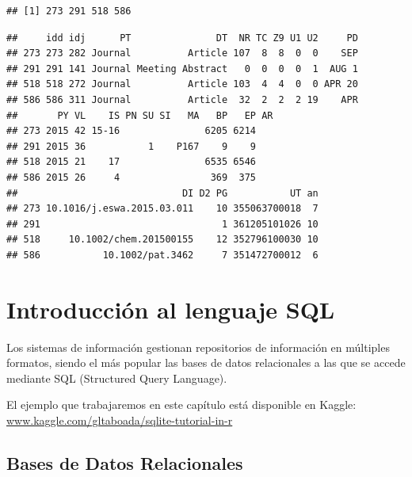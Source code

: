 \documentclass[
]{book}
\newenvironment{Shaded}{\begin{snugshade}}{\end{snugshade}}
\newcommand{\CommentTok}[1]{\textcolor[rgb]{0.56,0.35,0.01}{\textit{#1}}}
\newcommand{\DecValTok}[1]{\textcolor[rgb]{0.00,0.00,0.81}{#1}}
\newcommand{\FunctionTok}[1]{\textcolor[rgb]{0.13,0.29,0.53}{\textbf{#1}}}
\newcommand{\NormalTok}[1]{#1}
\newcommand{\SpecialCharTok}[1]{\textcolor[rgb]{0.81,0.36,0.00}{\textbf{#1}}}
\begin{document}
\begin{verbatim}
## [1] 273 291 518 586
\end{verbatim}

\begin{Shaded}
\end{Shaded}

\begin{verbatim}
##     idd idj      PT               DT  NR TC Z9 U1 U2     PD
## 273 273 282 Journal          Article 107  8  8  0  0    SEP
## 291 291 141 Journal Meeting Abstract   0  0  0  0  1  AUG 1
## 518 518 272 Journal          Article 103  4  4  0  0 APR 20
## 586 586 311 Journal          Article  32  2  2  2 19    APR
##       PY VL    IS PN SU SI   MA   BP   EP AR
## 273 2015 42 15-16               6205 6214   
## 291 2015 36           1    P167    9    9   
## 518 2015 21    17               6535 6546   
## 586 2015 26     4                369  375   
##                             DI D2 PG           UT an
## 273 10.1016/j.eswa.2015.03.011    10 355063700018  7
## 291                                1 361205101026 10
## 518     10.1002/chem.201500155    12 352796100030 10
## 586           10.1002/pat.3462     7 351472700012  6
\end{verbatim}

\hypertarget{introducciuxf3n-al-lenguaje-sql}{%
\chapter{Introducción al lenguaje SQL}\label{introducciuxf3n-al-lenguaje-sql}}

Los sistemas de información gestionan repositorios de información en múltiples formatos,
siendo el más popular las bases de datos relacionales a las que se accede mediante SQL (Structured Query Language).

El ejemplo que trabajaremos en este capítulo está disponible en Kaggle: \href{https://www.kaggle.com/gltaboada/sqlite-tutorial-in-r}{www.kaggle.com/gltaboada/sqlite-tutorial-in-r}

\hypertarget{bases-de-datos-relacionales}{%
\section{Bases de Datos Relacionales}\label{bases-de-datos-relacionales}}
\end{document}
